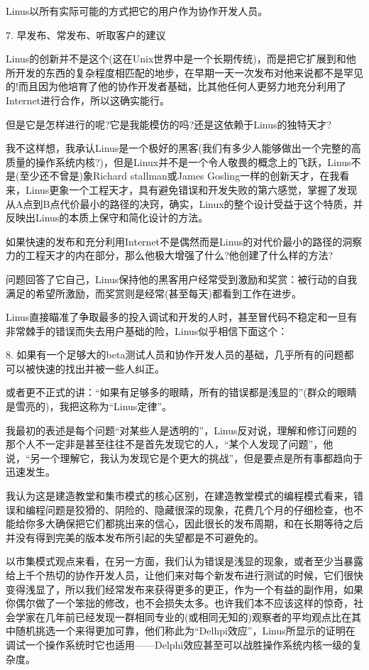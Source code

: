 \documentclass[a4paper,12pt,UTF8,twoside]{ctexbook}
\begin{document}
Linus以所有实际可能的方式把它的用户作为协作开发人员。


7. 早发布、常发布、听取客户的建议

Linus的创新并不是这个(这在Unix世界中是一个长期传统)，而是把它扩展到和他所开发的东西的复杂程度相匹配的地步，在早期一天一次发布对他来说都不是罕见的!而且因为他培育了他的协作开发者基础，比其他任何人更努力地充分利用了Internet进行合作，所以这确实能行。


但是它是怎样进行的呢?它是我能模仿的吗?还是这依赖于Linus的独特天才?


我不这样想，我承认Linus是一个极好的黑客(我们有多少人能够做出一个完整的高质量的操作系统内核?)，但是Linux并不是一个令人敬畏的概念上的飞跃，Linus不是(至少还不曾是)象Richard stallman或James Gosling一样的创新天才，在我看来，Linus更象一个工程天才，具有避免错误和开发失败的第六感觉，掌握了发现从A点到B点代价最小的路径的决窍，确实，Linux的整个设计受益于这个特质，并反映出Linus的本质上保守和简化设计的方法。


如果快速的发布和充分利用Internet不是偶然而是Linus的对代价最小的路径的洞察力的工程天才的内在部分，那么他极大增强了什么?他创建了什么样的方法?


问题回答了它自己，Linus保持他的黑客用户经常受到激励和奖赏：被行动的自我满足的希望所激励，而奖赏则是经常(甚至每天)都看到工作在进步。


Linus直接瞄准了争取最多的投入调试和开发的人时，甚至冒代码不稳定和一旦有非常棘手的错误而失去用户基础的险，Linus似乎相信下面这个：

8. 如果有一个足够大的beta测试人员和协作开发人员的基础，几乎所有的问题都可以被快速的找出并被一些人纠正。


或者更不正式的讲：“如果有足够多的眼睛，所有的错误都是浅显的”(群众的眼睛是雪亮的)，我把这称为“Linus定律”。


我最初的表述是每个问题“对某些人是透明的”，Linus反对说，理解和修订问题的那个人不一定非是甚至往往不是首先发现它的人，“某个人发现了问题”，他说，“另一个理解它，我认为发现它是个更大的挑战”，但是要点是所有事都趋向于迅速发生。


我认为这是建造教堂和集市模式的核心区别，在建造教堂模式的编程模式看来，错误和编程问题是狡猾的、阴险的、隐藏很深的现象，花费几个月的仔细检查，也不能给你多大确保把它们都挑出来的信心，因此很长的发布周期，和在长期等待之后并没有得到完美的版本发布所引起的失望都是不可避免的。


以市集模式观点来看，在另一方面，我们认为错误是浅显的现象，或者至少当暴露给上千个热切的协作开发人员，让他们来对每个新发布进行测试的时候，它们很快变得浅显了，所以我们经常发布来获得更多的更正，作为一个有益的副作用，如果你偶尔做了一个笨拙的修改，也不会损失太多。也许我们本不应该这样的惊奇，社会学家在几年前已经发现一群相同专业的(或相同无知的)观察者的平均观点比在其中随机挑选一个来得更加可靠，他们称此为“Delhpi效应”，Linus所显示的证明在调试一个操作系统时它也适用——Delphi效应甚至可以战胜操作系统内核一级的复杂度。
\end{document}
